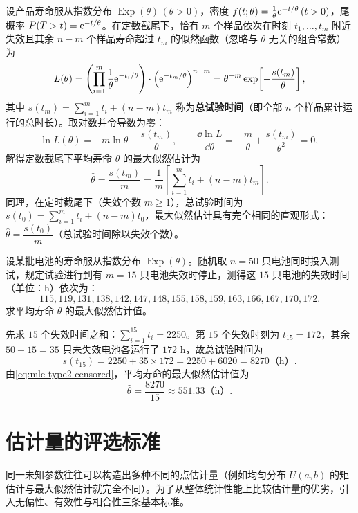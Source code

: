 设产品寿命服从指数分布 $\operatorname{Exp}(\theta)\,(\theta>0)$，密度 $f(t;\theta)=\frac{1}{\theta}\mathrm{e}^{-t/\theta}\,(t>0)$，尾概率 $P(T>t)=\mathrm{e}^{-t/\theta}$。在定数截尾下，恰有 $m$ 个样品依次在时刻 $t_1,\ldots,t_m$ 附近失效且其余 $n-m$ 个样品寿命超过 $t_m$ 的似然函数（忽略与 $\theta$ 无关的组合常数）为
\[
  L(\theta)=\left(\prod_{i=1}^{m}\frac{1}{\theta}\mathrm{e}^{-t_i/\theta}\right)\cdot\left(\mathrm{e}^{-t_m/\theta}\right)^{n-m}
  =\theta^{-m}\exp\!\left[-\frac{s(t_m)}{\theta}\right],
\]
其中 $s(t_m)=\sum_{i=1}^{m}t_i+(n-m)t_m$ 称为\textbf{总试验时间}（即全部 $n$ 个样品累计运行的总时长）。取对数并令导数为零：
\[
  \ln L(\theta)=-m\ln\theta-\frac{s(t_m)}{\theta},\qquad
  \frac{\dd\ln L}{\dd\theta}=-\frac{m}{\theta}+\frac{s(t_m)}{\theta^2}=0,
\]
解得定数截尾下平均寿命 $\theta$ 的最大似然估计为
\begin{equation}
  \hat{\theta}=\frac{s(t_m)}{m}=\frac{1}{m}\left[\sum_{i=1}^{m}t_i+(n-m)t_m\right].
  \label{eq:mle-type2-censored}
\end{equation}
同理，在定时截尾下（失效个数 $m\ge 1$），总试验时间为 $s(t_0)=\sum_{i=1}^{m}t_i+(n-m)t_0$，最大似然估计具有完全相同的直观形式：$\hat{\theta}=\dfrac{s(t_0)}{m}$（总试验时间除以失效个数）。

\begin{example}[title={电池定数截尾寿命试验的极大似然估计}]
\label{eg:censored-battery}
设某批电池的寿命服从指数分布 $\operatorname{Exp}(\theta)$。随机取 $n=50$ 只电池同时投入测试，规定试验进行到有 $m=15$ 只电池失效时停止，测得这 $15$ 只电池的失效时间（单位：$\mathrm{h}$）依次为：
\[
  115,119,131,138,142,147,148,155,158,159,163,166,167,170,172.
\]
求平均寿命 $\theta$ 的最大似然估计值。
\begin{solution}
先求 $15$ 个失效时间之和：$\sum_{i=1}^{15}t_i=2250$。第 $15$ 个失效时刻为 $t_{15}=172$，其余 $50-15=35$ 只未失效电池各运行了 $172\text{ h}$，故总试验时间为
\[
  s(t_{15})=2250+35\times 172=2250+6020=8270\text{（h）}.
\]
由\eqref{eq:mle-type2-censored}，平均寿命的最大似然估计值为
\[
  \hat{\theta}=\frac{8270}{15}\approx 551.33\text{（h）}.
\]
\end{solution}
\end{example}

\section{估计量的评选标准}
\label{sec:estimator-criteria}

同一未知参数往往可以构造出多种不同的点估计量（例如均匀分布 $U(a,b)$ 的矩估计与最大似然估计就完全不同）。为了从整体统计性能上比较估计量的优劣，引入无偏性、有效性与相合性三条基本标准。

